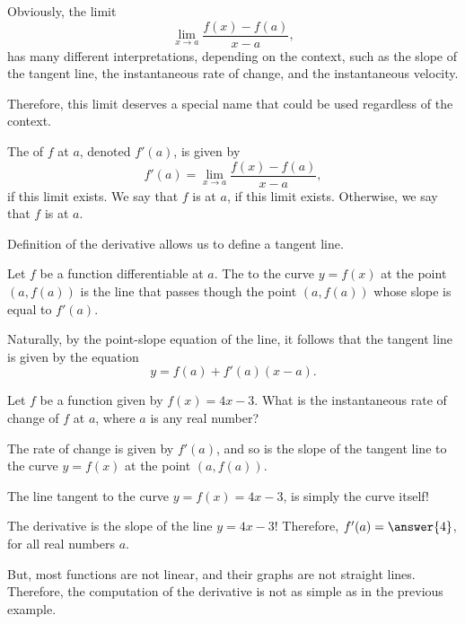 \documentclass{ximera}
\begin{document}
Obviously, the limit
 \[
     \lim_{x\to a} \frac{f(x)-f(a)}{x-a},
    \] 
    has many different interpretations, depending on the context, such as the slope of the tangent line, the  instantaneous rate of change, and the instantaneous velocity.
    
    Therefore, this limit deserves a special name that could be used regardless of the context.
    \begin{definition}
  The  of $f$ at $a$, denoted $f'(a)$, is given by
  \[
 f'(a) = \lim_{x\to a} \frac{f(x) - f(a)}{x-a},
  \]
  if this limit exists. We say that $f$ is 
  at $a$, if  this limit  exists. Otherwise,  we say that  $f$ is  at $a$.
\end{definition}

Definition of the derivative allows us to define a tangent line.
  \begin{definition}
  Let $f$ be a function differentiable at $a$. The  to  the curve $y=f(x)$ at the point $(a,f(a))$ is the line that passes though the point $(a,f(a))$ whose slope is equal to $f'(a)$.
    \end{definition}
  
  Naturally, by the point-slope equation of the line, it follows that the tangent line is given by the equation
  \[
 y = f(a)+f'(a)(x-a).
  \]
            \begin{question}
            Let $f$ be a function given by $f(x) = 4x-3$.
	What is the instantaneous rate of change of $f$ at $a$, where $a$ is any real number?
	\begin{hint}
		The rate of change is given by $f'(a)$, and so is the slope of the tangent line to the curve $y=f(x)$ at the point $(a,f(a))$.
	\end{hint}
	\begin{hint}
		The line tangent to the curve $y=f(x) = 4x-3$, is simply the curve itself!
	\end{hint}
	\begin{prompt}
		The derivative is the slope of the line $y= 4x-3$! Therefore,  $f'(a)=\answer{4}$, for all real numbers $a$.
	\end{prompt}
\end{question}


But, most functions are not linear, and  their graphs are not  straight lines.  Therefore, the computation of the derivative is not as simple as in the previous example.
\end{document}
